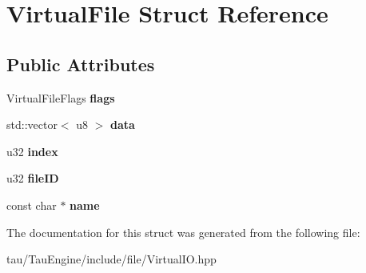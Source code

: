 \hypertarget{struct_virtual_file}{}\section{Virtual\+File Struct Reference}
\label{struct_virtual_file}
\subsection*{Public Attributes}
\begin{DoxyCompactItemize}
\item 
\mbox{\label{struct_virtual_file_a6243ce1d1083c07b71df5ee65c6a0504}} 
Virtual\+File\+Flags {\bfseries flags}
\item 
\mbox{\label{struct_virtual_file_a4d6561179b3b3726679d9adbc3e862ad}} 
std\+::vector$<$ u8 $>$ {\bfseries data}
\item 
\mbox{\label{struct_virtual_file_aa7bb7aaf98de7b5d7bc1c1b953bb4f38}} 
u32 {\bfseries index}
\item 
\mbox{\label{struct_virtual_file_aa0be590959d580089b4f69bbe3f648f4}} 
u32 {\bfseries file\+ID}
\item 
\mbox{\label{struct_virtual_file_a162fb3f54b3c485725f61317541db5ea}} 
const char $\ast$ {\bfseries name}
\end{DoxyCompactItemize}


The documentation for this struct was generated from the following file\+:\begin{DoxyCompactItemize}
\item 
tau/\+Tau\+Engine/include/file/Virtual\+I\+O.\+hpp\end{DoxyCompactItemize}
